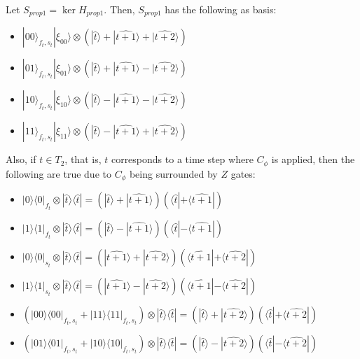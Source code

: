 \documentclass{article}
\theoremstyle{definition}
\begin{document}
Let $S_{prop1}=\ker H_{prop1}$.
Then, $S_{prop1}$ has the following as basis:
\begin{itemize}
	\item $|00\rangle_{f_t,s_t}|\xi_{00}\rangle\otimes
		(|\widehat{t}\rangle+|\widehat{t+1}\rangle+|\widehat{t+2}\rangle)$
	\item $|01\rangle_{f_t,s_t}|\xi_{01}\rangle\otimes
		(|\widehat{t}\rangle+|\widehat{t+1}\rangle-|\widehat{t+2}\rangle)$
	\item $|10\rangle_{f_t,s_t}|\xi_{10}\rangle\otimes
		(|\widehat{t}\rangle-|\widehat{t+1}\rangle-|\widehat{t+2}\rangle)$
	\item $|11\rangle_{f_t,s_t}|\xi_{11}\rangle\otimes
		(|\widehat{t}\rangle-|\widehat{t+1}\rangle+|\widehat{t+2}\rangle)$
\end{itemize}

Also, if $t\in T_2$, that is, $t$ corresponds to a time step where $C_\phi$ is applied, then the following are true due to $C_\phi$ being surrounded by $Z$ gates:
\begin{itemize}
	\item $|0\rangle\langle0|_{f_t}\otimes
		|\widehat{t}\rangle\langle\widehat{t}|
		=(|\widehat{t}\rangle+|\widehat{t+1}\rangle)
		(\langle\widehat{t}|+\langle\widehat{t+1}|)$
	\item $|1\rangle\langle1|_{f_t}\otimes
		|\widehat{t}\rangle\langle\widehat{t}|
		=(|\widehat{t}\rangle-|\widehat{t+1}\rangle)
		(\langle\widehat{t}|-\langle\widehat{t+1}|)$
	\item $|0\rangle\langle0|_{s_t}\otimes
		|\widehat{t}\rangle\langle\widehat{t}|
		=(|\widehat{t+1}\rangle+|\widehat{t+2}\rangle)
		(\langle\widehat{t+1}|+\langle\widehat{t+2}|)$
	\item $|1\rangle\langle1|_{s_t}\otimes
		|\widehat{t}\rangle\langle\widehat{t}|
		=(|\widehat{t+1}\rangle-|\widehat{t+2}\rangle)
		(\langle\widehat{t+1}|-\langle\widehat{t+2}|)$
	\item $(|00\rangle\langle00|_{f_t,s_t}
		+|11\rangle\langle11|_{f_t,s_t})\otimes
		|\widehat{t}\rangle\langle\widehat{t}|
		=(|\widehat{t}\rangle+|\widehat{t+2}\rangle)
		(\langle\widehat{t}|+\langle\widehat{t+2}|)$
	\item $(|01\rangle\langle01|_{f_t,s_t}
		+|10\rangle\langle10|_{f_t,s_t})\otimes
		|\widehat{t}\rangle\langle\widehat{t}|
		=(|\widehat{t}\rangle-|\widehat{t+2}\rangle)
		(\langle\widehat{t}|-\langle\widehat{t+2}|)$
\end{itemize}
\end{document}
